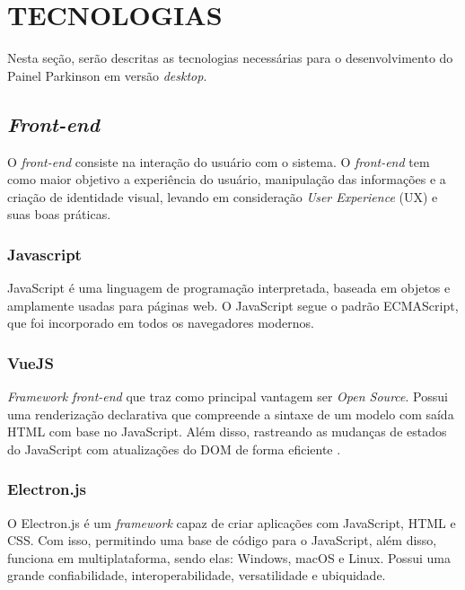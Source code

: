 
\chapter{TECNOLOGIAS}
\label{chap:tecnologias}

Nesta seção, serão descritas as tecnologias necessárias para o desenvolvimento do Painel Parkinson em versão \textit{desktop}.

\section{\textit{Front-end}}
\label{sec:Front end}

O \textit{front-end} consiste na interação do usuário com o sistema. O \textit{front-end} tem como maior objetivo a experiência do usuário, manipulação das informações e a criação de identidade visual, levando em consideração \textit{User Experience} (UX) e suas boas práticas.

\subsection{Javascript}
\label{sec:Javascript}

JavaScript é uma linguagem de programação interpretada, baseada em objetos e amplamente usadas para páginas web. O JavaScript segue o padrão ECMAScript, que foi incorporado em todos os navegadores modernos.

\subsection{VueJS}
\label{sec:VueJS}

\textit{Framework front-end} que traz como principal vantagem ser \textit{Open Source}. Possui uma renderização declarativa que compreende a sintaxe de um modelo com saída HTML com base no JavaScript. Além disso, rastreando as mudanças de estados do JavaScript com atualizações do DOM de forma eficiente \cite{vuejs_intro}.

\subsection{Electron.js}
\label{sec:ElectronJS}

O Electron.js é um \textit{framework} capaz de criar aplicações com JavaScript, HTML e CSS. Com isso, permitindo uma base de código para o JavaScript, além disso, funciona em multiplataforma, sendo elas: Windows, macOS e Linux.
Possui uma grande confiabilidade, interoperabilidade, versatilidade e ubiquidade.

